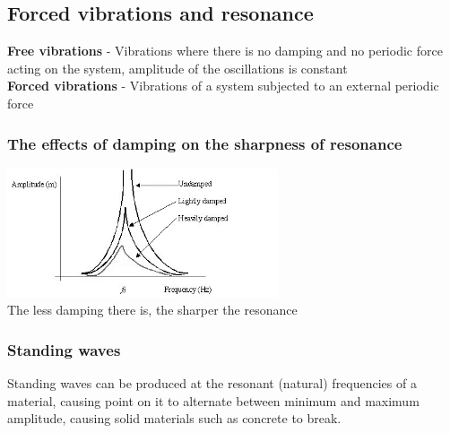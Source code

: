 \documentclass[12pt]{article}
\begin{document}
\subsection{Forced vibrations and resonance}
\textbf{Free vibrations} - Vibrations where there is no damping and no periodic force acting on the system, amplitude of the oscillations is constant\\
\textbf{Forced vibrations} - Vibrations of a system subjected to an external periodic force
\subsubsection{The effects of damping on the sharpness of resonance}
\includegraphics[width=8cm]{damp_6.jpg}\\
The less damping there is, the sharper the resonance
\subsubsection{Standing waves}
Standing waves can be produced at the resonant (natural) frequencies of a material, causing point on it to alternate between minimum and maximum amplitude, causing solid materials such as concrete to break.
\end{document}
